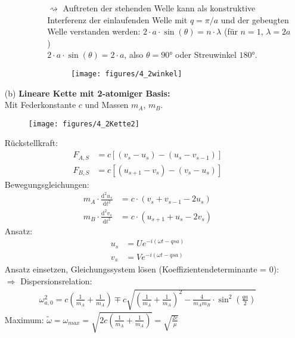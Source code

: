 \begin{itemize}
\begin{itemize}
\begin{itemize}
\begin{itemize}
					$\rightsquigarrow$ Auftreten der stehenden Welle kann als konstruktive Interferenz der einlaufenden Welle mit $ q = \pi / a $ und der gebeugten Welle verstanden werden: $ 2 \cdot a \cdot \sin(\theta) = n \cdot \lambda $ (für $n=1$, $\lambda = 2a$) \\
					$2 \cdot a \cdot \sin(\theta) = 2 \cdot a $, also $\theta = \ang{90}$ oder Streuwinkel $\ang{180}$.
					\begin{figure}[H]
						\centering
						\texttt{[image: figures/4\_2winkel]}
						\caption{}
						\label{fig:4_2winkel}
					\end{figure}
				\end{itemize} 
			\end{itemize}
	\end{itemize}
	\item[(b)] \textbf{Lineare Kette mit 2-atomiger Basis:} \\
		Mit Federkonstante $c$ und Massen $m_A$, $m_B$.
		\begin{figure}[H]
			\centering
			\texttt{[image: figures/4\_2Kette2]}
			\caption{}
			\label{fig:4_2kette2}
		\end{figure} 
		Rückstellkraft:
		\begin{align*}
			F_{A,S} &= c \left[(v_s - u_s) - (u_s - v_{s-1})\right] \\
			F_{B,S} &= c \left[(u_{s+1} - v_s) - (v_s - u_{s})\right] 
		\end{align*}
		Bewegungsgleichungen:
		\begin{align*}
			m_A \cdot \frac{\mathrm{d}^2u_s}{\mathrm{d}t^2} &= c \cdot (v_s + v_{s-1} - 2 u_s) \\
			m_B \cdot \frac{\mathrm{d}^2v_s}{\mathrm{d}t^2} &= c \cdot (u_{s+1} + u_s - 2 v_s)
		\end{align*}
		Ansatz:
		\begin{align*}
			u_s &= U e^{-i(\omega t - q s a)} \\
			v_s &= V e^{-i(\omega t - q s a)}
		\end{align*}
		Ansatz einsetzen, Gleichungssystem lösen (Koeffizientendeterminante = 0):\\
		$\Rightarrow$ Dispersionsrelation:
		\begin{align*}
			\omega_{a,0}^2 = c \left( \frac{1}{m_A} + \frac{1}{m_A} \right) \mp c \sqrt{\left( \frac{1}{m_A} + \frac{1}{m_A} \right)^2 - \frac{4}{m_A m_B} \cdot \sin^2 \left(\frac{qa}{2}\right)}
		\end{align*}
		Maximum: $\tilde{\omega} = \omega_{max} = \sqrt{2c \left( \frac{1}{m_A} + \frac{1}{m_A} \right)} = \sqrt{\frac{2c}{\mu}}$

\end{itemize}
